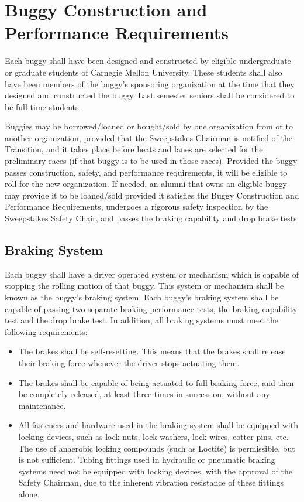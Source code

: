 \chapter{Buggy Construction and Performance Requirements}

	Each buggy shall have been designed and constructed by eligible undergraduate or graduate students of Carnegie Mellon University. These students shall also have been members of the buggy's sponsoring organization at the time that they designed and constructed the buggy. Last semester seniors shall be considered
	to be full-time students.

	Buggies may be borrowed/loaned or bought/sold by one organization from or to another organization, provided that the Sweepstakes Chairman is notified of the Transition, and it takes place before heats and lanes are selected for the preliminary races (if that buggy is to be used in those races). Provided the buggy passes construction, safety, and performance requirements, it will be eligible to roll for the new organization. If needed, an alumni that owns an eligible buggy may provide it to be loaned/sold provided it satisfies the Buggy Construction and Performance Requirements, undergoes a rigorous safety inspection by the Sweepstakes Safety Chair, and passes the braking capability and drop brake tests.

\section{Braking System}

	Each buggy shall have a driver operated system or mechanism which is capable of stopping the rolling motion
	of that buggy. This system or mechanism shall be known as the buggy's braking system. Each buggy's
	braking system shall be capable of passing two separate braking performance tests, the braking capability
	test and the drop brake test. In addition, all braking systems must meet the following requirements:


	\begin{itemize}

		\item
		The brakes shall be self-resetting. This means that the brakes shall release their braking force whenever
		the driver stops actuating them.


		\item
		The brakes shall be capable of being actuated to full braking force, and then be completely released,
		at least three times in succession, without any maintenance.
		

		\item
		All fasteners and hardware used in the braking system shall be equipped with locking devices, such as
		lock nuts, lock washers, lock wires, cotter pins, etc. The use of anaerobic locking compounds (such as
		Loctite) is permissible, but is not sufficient. Tubing fittings used in hydraulic or pneumatic braking
		systems need not be equipped with locking devices, with the approval of the Safety Chairman, due to
		the inherent vibration resistance of these fittings alone.
		

	\end{itemize}

